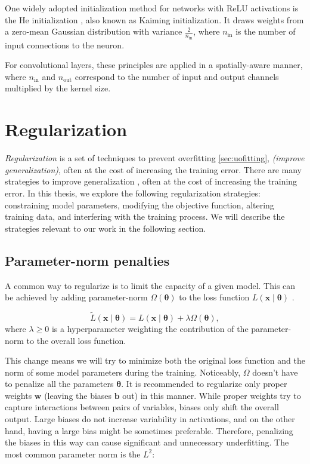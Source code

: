 One widely adopted initialization method for networks with ReLU activations is the He initialization \cite{he2015delving}, also known as Kaiming initialization. It draws weights from a zero-mean Gaussian distribution with variance $\frac{2}{n_{\text{in}}}$, where $n_{\text{in}}$ is the number of input connections to the neuron. 

For convolutional layers, these principles are applied in a spatially-aware manner, where $n_{\text{in}}$ and $n_{\text{out}}$ correspond to the number of input and output channels multiplied by the kernel size.

\section{Regularization}

\emph{Regularization} is a set of techniques to prevent overfitting \ref{sec:uofitting}, \textit{(improve generalization)}, often at the cost of increasing the training error. There are many strategies to improve generalization \cite{bengio2017deep}, often at the cost of increasing the training error. In this thesis, we explore the following regularization strategies: constraining model parameters, modifying the objective function, altering training data, and interfering with the training process. We will describe the strategies relevant to our work in the following section.

\subsection{Parameter-norm penalties}

A common way to regularize is to limit the capacity of a given model. This can be achieved by adding parameter-norm $\Omega(\bm{\theta})$ to the loss function $L(\bm{x} \mid \bm{\theta})$ \cite{bengio2017deep}. 

\begin{equation}
	\label{eq:loss-parameter-norm}
	\tilde{L}(\bm{x} \mid \bm{\theta}) = L(\bm{x} \mid \bm{\theta}) + \lambda \Omega(\bm{\theta}),
\end{equation}
where $\lambda \geq 0$ is a hyperparameter weighting the contribution of the parameter-norm to the overall loss function.

This change means we will try to minimize both the original loss function and the norm of some model parameters during the training. Noticeably, $\Omega$ doesn't have to penalize all the parameters $\bm{\theta}$. It is recommended to regularize only proper weights $\bm{w}$ (leaving the biases $\bm{b}$ out) in this manner. While proper weights try to capture interactions between pairs of variables, biases only shift the overall output. Large biases do not increase variability in activations, and on the other hand, having a large bias might be sometimes preferable. Therefore, penalizing the biases in this way can cause significant and unnecessary underfitting. The most common parameter norm is the $L^2$:

